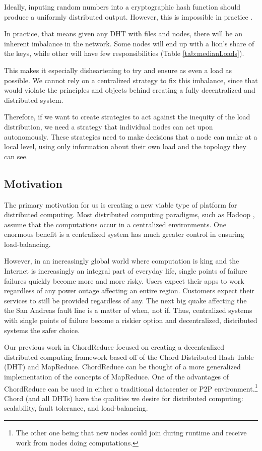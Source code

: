 Ideally, inputing random numbers into a cryptographic hash function should produce a uniformly distributed output.
However, this is impossible in practice \cite{hash-outputs} \cite{thomsen2005cryptographic}.

In practice, that means given any DHT with files and nodes, there will be an inherent imbalance in the network.
Some nodes will end up with a lion's share of the keys, while other will have few responsibilities (Table \ref{tab:medianLoads}).


This makes it especially disheartening to try and ensure as even a load as possible.
We cannot rely on a centralized strategy to fix this imbalance, since that would violate the principles and objects behind creating a fully decentralized and distributed system.

Therefore, if we want to create strategies to act against the inequity of the load distribution, we need a strategy that individual nodes can act upon autonomously.
These strategies need to make decisions that a node can make at a local level, using only information about their own load and the topology they can see.


\subsection{Motivation}
The primary motivation for us is creating a new viable type of platform for distributed computing.
Most distributed computing paradigms, such as Hadoop \cite{hadoop}, assume that the computations occur in a centralized environments.
One enormous benefit is a centralized system has much greater control in ensuring load-balancing.

However, in an increasingly global world where computation is king and the Internet is increasingly an integral part of everyday life, single points of failure failures quickly become more and more risky.
Users expect their apps to work regardless of any power outage affecting an entire region.
Customers expect their services to still be provided regardless of any.
The next big quake affecting the the San Andreas fault line is a matter of when, not if.
Thus, centralized systems with single points of failure become a riskier option and decentralized, distributed systems the safer choice.


Our previous work in ChordReduce \cite{chordreduce} focused on creating a decentralized distributed computing framework based off of the Chord Distributed Hash Table (DHT) and MapReduce.
ChordReduce can be thought of a more generalized implementation of the concepts of MapReduce.
One of the advantages of ChordReduce can be used in either a traditional datacenter or P2P environment.\footnote{The other one being that new nodes could join during runtime and receive work from nodes doing computations.}
Chord (and all DHTs) have the qualities we desire for distributed computing: scalability, fault tolerance, and load-balancing.

